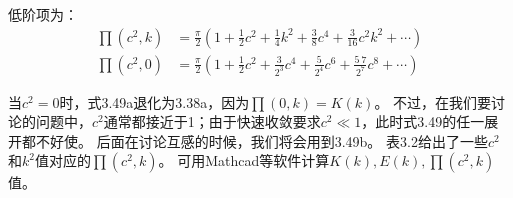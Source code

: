 低阶项为：
\begin{subequations}
	\begin{align}
\prod(c^2,k) &= \frac{\pi}{2}\left(1+\frac{1}{2}c^2+\frac{1}{4}k^2+\frac{3}{8}c^4+\frac{3}{16}c^2 k^2+\cdots \right) \\ 
\prod(c^2,0) &= \frac{\pi}{2}\left(1+\frac{1}{2}c^2+\frac{3}{2^3}c^4+\frac{5}{2^4}c^6+\frac{5\ 7}{2^7}c^8+\cdots \right) 
	\end{align}
\end{subequations}

当$c^2=0$时，式3.49a退化为3.38a，因为$\prod(0,k)=K(k)$。
不过，在我们要讨论的问题中，$c^2$通常都接近于1；由于快速收敛要求$c^2\ll 1$，此时式3.49的任一展开都不好使。
后面在讨论互感的时候，我们将会用到3.49b。
表3.2给出了一些$c^2$和$k^2$值对应的$\prod(c^2,k)$。
可用Mathcad等软件计算$K(k),E(k),\prod(c^2,k)$值。

